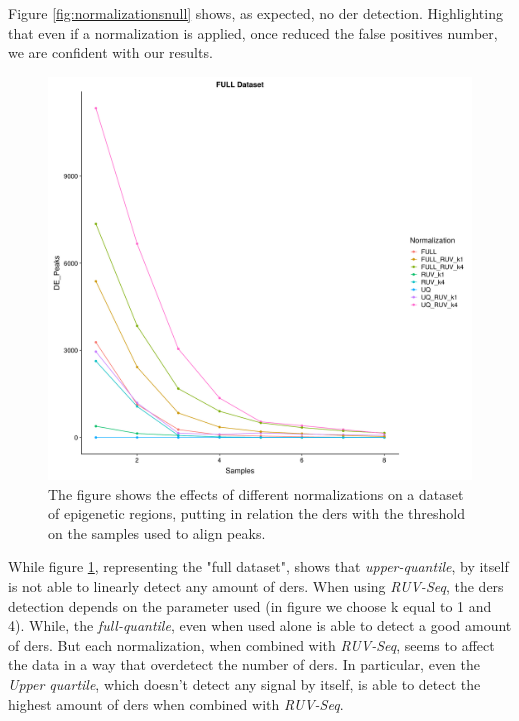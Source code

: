 Figure \ref{fig:normalizationsnull} shows, as expected, no \gls{der} detection. 
Highlighting that even if a normalization is applied, once reduced the false positives number, we are confident with our results.


\begin{figure}[H]
\centering
\includegraphics[width=\textwidth, height=\textheight, keepaspectratio]{img/descan2/full_final.pdf}
\caption[Normalizations applied to detected regions]{The figure shows the effects of different normalizations on a dataset of epigenetic regions, putting in relation the \glspl{der} with the threshold on the samples used to align peaks.}
\label{fig:normalizationsfull}
\centering
\end{figure}

While figure \ref{fig:normalizationsfull}, representing the "full dataset", shows that \textit{upper-quantile}, by itself is not able to linearly detect any amount of \glspl{der}.
When using \textit{RUV-Seq}, the \glspl{der} detection depends on the parameter used (in figure we choose k equal to 1 and 4).
While, the \textit{full-quantile}, even when used alone is able to detect a good amount of \glspl{der}.
But each normalization, when combined with \textit{RUV-Seq}, seems to affect the data in a way that overdetect the number of \glspl{der}. 
In particular, even the \textit{Upper quartile}, which doesn't detect any signal by itself, is able to detect the highest amount of \glspl{der} when combined with \textit{RUV-Seq}.


